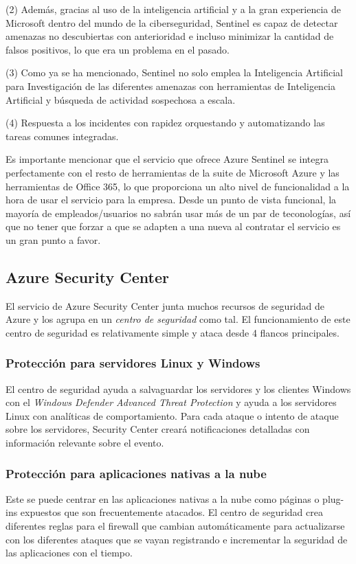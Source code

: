 \documentclass[english,runningheads,a4paper]{llncs}[2018/03/10]
\begin{document}
(2) Además, gracias al uso de la inteligencia artificial y a la
gran experiencia de Microsoft dentro del mundo de la ciberseguridad, Sentinel es
capaz de detectar amenazas no descubiertas con anterioridad e incluso minimizar
la cantidad de falsos positivos, lo que era un problema en el pasado.

(3) Como ya se ha mencionado, Sentinel no solo emplea la Inteligencia Artificial
para Investigación de las diferentes amenazas con herramientas de Inteligencia
Artificial y búsqueda de actividad sospechosa a escala.

(4) Respuesta a los incidentes con rapidez orquestando y automatizando las
tareas comunes integradas.

Es importante mencionar que el servicio que ofrece Azure Sentinel se integra
perfectamente con el resto de herramientas de la suite de Microsoft Azure y las
herramientas de Office 365, lo que proporciona un alto nivel de funcionalidad a
la hora de usar el servicio para la empresa. Desde un punto de vista
funcional, la mayoría de empleados/usuarios no sabrán usar más de un par de
teconologías, así que no tener que forzar a que se adapten a una nueva al
contratar el servicio es un gran punto a favor.

\subsection*{Azure Security Center}

El servicio de Azure Security Center junta muchos recursos de seguridad de Azure
y los agrupa en un \textit{centro de seguridad} como tal. El funcionamiento de
este centro de seguridad es relativamente simple y ataca desde 4 flancos
principales.

\subsubsection*{Protección para servidores Linux y Windows}
El centro de seguridad ayuda a salvaguardar los servidores y los clientes
Windows con el \textit{Windows Defender Advanced Threat Protection} y ayuda a
los servidores Linux con analíticas de comportamiento. Para cada ataque o
intento de ataque sobre los servidores, Security Center creará notificaciones
detalladas con información relevante sobre el evento.

\subsubsection*{Protección para aplicaciones nativas a la nube}
Este se puede centrar en las aplicaciones nativas a la nube como páginas o
plug-ins expuestos que son frecuentemente atacados. El centro de seguridad crea
diferentes reglas para el firewall que cambian automáticamente para actualizarse
con los diferentes ataques que se vayan registrando e incrementar la seguridad
de las aplicaciones con el tiempo.
\end{document}
